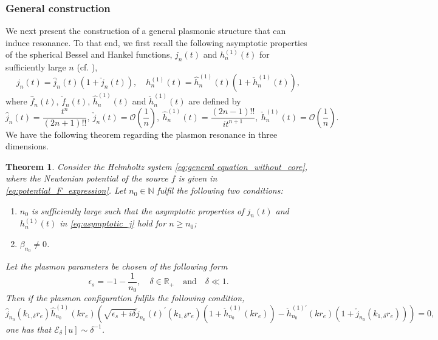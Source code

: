 \documentclass[11pt,reqno,twoside]{amsart}
\newtheorem{thm}{Theorem}[section]
\theoremstyle{definition}
\theoremstyle{remark}
\numberwithin{equation}{section}
\begin{document}
\subsubsection{General construction}

We next present the construction of a general plasmonic structure that can induce resonance. To that end, we first recall the following asymptotic properties of the spherical Bessel and Hankel functions, $j_n(t)$ and $h_n^{(1)}(t)$ for sufficiently large $n$ (cf. \cite{CK}),
\begin{equation}\label{eq:asymptotic_j}
  j_n(t)=\hat{j}_n(t)\left(1+ \check{j}_n(t) \right),\quad h_n^{(1)}(t)=\hat{h}_n^{(1)}(t) \left(1+\check{h}_n^{(1)}(t) \right),
\end{equation}
where  $\hat{f}_n(t)$, $\check{f}_n(t)$, $\hat{h}_n^{(1)}(t)$ and $\check{h}_n^{(1)}(t)$ are defined by
\begin{equation}\label{eq:dd1}
\hat{j}_n(t)=\frac{t^n}{(2n+1)!!}, \ \check{j}_n(t)=\mathcal{O}\left(\frac{1}{n}\right),\ \hat{h}_n^{(1)}(t)=\frac{(2n-1)!!}{it^{n+1}},  \ \check{h}_n^{(1)}(t)=\mathcal{O}\left(\frac{1}{n}\right).
\end{equation}
We have the following theorem regarding the plasmon resonance in three dimensions.
\begin{thm}\label{thm:main1}
Consider the Helmholtz system \eqref{eq:general equation_without_core}, where the Newtonian potential of the source $f$ is given in \eqref{eq:potential_F_expression}. Let $n_0\in\mathbb{N}$ fulfil the following two conditions:
 \begin{enumerate}
     \item $n_0$ is sufficiently large such that the asymptotic properties of $j_{n}(t)$ and $h_{n}^{(1)}(t)$ in \eqref{eq:asymptotic_j} hold for $n\geq n_0$;
     \item $\beta_{n_0}\neq 0$.
   \end{enumerate}
Let the plasmon parameters be chosen of the following form
  \begin{equation}\label{eq:ccc1}
    \epsilon_s=-1-\frac{1}{n_0} ,\quad \delta\in\mathbb{R}_+ \quad \mbox{and} \quad \delta\ll1. 
  \end{equation}
  Then if the plasmon configuration fulfils the following condition, 
  \begin{equation}\label{eq:k_no_three}
 \hat{j}_{n_0}(k_{1,\delta} r_e) \hat{h}_{n_0}^{(1)}(kr_e)  \left(  \sqrt{\epsilon_s+i\delta}  \check{j}_{n_0}(t)^{\prime}(k_{1,\delta} r_e)\left(1+\check{h}_{n_0}^{(1)}(kr_e)\right)  -\check{h}_{n_0}^{(1)\prime}(kr_e)\left(1+\check{j}_{n_0}(k_{1,\delta} r_e)\right)   \right)=0,  
\end{equation}
one has that $\mathscr{E}_\delta[u]\sim \delta^{-1}$. 
\end{thm}
\end{document}
